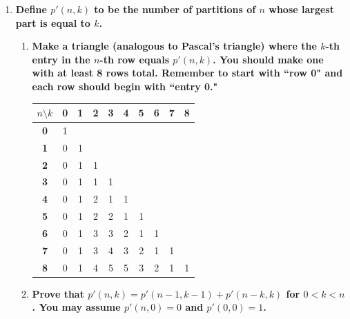 \documentclass[10pt]{article}
\begin{document}
\begin{enumerate}
\begin{enumerate}
We need to find $c_1$ and $c_2$. Let $n = 0,1$, we have:

$$\begin{cases}
     c_1 \cdot \lambda_1^0 + c_2 \cdot \lambda_2^0 &= b_0 \\
    c_1 \cdot \lambda_1^1 + c_2 \cdot \lambda_2^1 &= b_1
\end{cases}$$

Then we substitute the value of $\lambda_1$ and $\lambda_2$:

$$\begin{cases}
    c_1 + c_2 &= 1\\
    \frac{1+\sqrt{5}}{2}c_1  + \frac{1-\sqrt{5}}{2}c_2 &= 1
\end{cases}$$

Solving these two equations, we have $c_1 = \frac{1}{\sqrt{5}} \cdot \left(\frac{1+\sqrt{5}}{2}\right)$ and $c_2 = \frac{-1}{\sqrt{5}} \cdot \left(\frac{1-\sqrt{5}}{2}\right)$. Therefore, the exact formula for $a_n$ is:

$$b_n=\frac{1}{\sqrt{5}} \cdot \left(\frac{1+\sqrt{5}}{2}\right)^{n+1}-\frac{1}{\sqrt{5}} \cdot \left(\frac{1-\sqrt{5}}{2}\right)^{n+1}$$
\end{enumerate}
\vskip 2cm



\item
\textbf{Define $p'(n,k)$ to be the number of partitions of $n$ whose largest part is equal to $k$.}
\begin{enumerate}
\item \textbf{Make a triangle (analogous to Pascal's triangle) where the $k$-th entry in the $n$-th row equals $p'(n,k)$. You should make one with at least 8 rows total.  Remember to start with ``row 0" and each row should begin with ``entry 0."}
\begin{table}[htbp]
\centering
\renewcommand{\arraystretch}{1.2}
    \begin{tabular}{c | c c c c c c c c c}
    $n \setminus k$ & \textbf{0} & \textbf{1} & \textbf{2} & \textbf{3} & \textbf{4} & \textbf{5} & \textbf{6} & \textbf{7} & \textbf{8} \\
    \hline
    \textbf{0} & 1 & & & & & & & & \\
    \textbf{1} & 0 & 1 & & & & & & & \\
    \textbf{2} & 0 & 1 & 1 & & & & & & \\
    \textbf{3} & 0 & 1 & 1 & 1 & & & & & \\
    \textbf{4} & 0 & 1 & 2 & 1 & 1 & & & & \\
    \textbf{5} & 0 & 1 & 2 & 2 & 1 & 1 & & & \\
    \textbf{6} & 0 & 1 & 3 & 3 & 2 & 1 & 1 & & \\
    \textbf{7} & 0 & 1 & 3 & 4 & 3 & 2 & 1 & 1 & \\
    \textbf{8} & 0 & 1 & 4 & 5 & 5 & 3 & 2 & 1 & 1 \\
    \end{tabular}
\end{table}
\item
\textbf{Prove that $p'(n,k)=p'(n-1,k-1)+p'(n-k,k)$ for $0<k<n$.  You may assume $p'(n,0)=0$ and $p'(0,0)=1$.}


\end{enumerate}
\end{enumerate}
\end{document}

